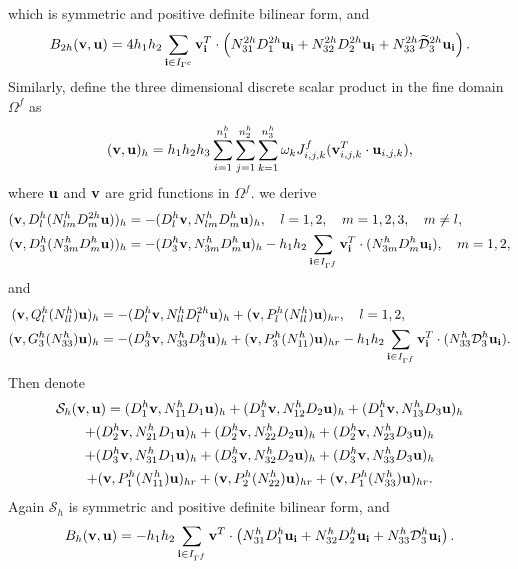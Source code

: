which is symmetric and positive definite bilinear form, and
\begin{equation}\label{bounary_c1}
B_{2h} ({\bf v},{\bf u}) = 4h_1h_2\sum_{{\bf i}\in I_{\Gamma^c}}{\bf v}_{\bf i}^T\cdot\left({N}_{31}^{2h}{D}_1^{2h}{\bf u}_{\bf i}+{N}_{32}^{2h}{D}_2^{2h}{\bf u}_{\bf i}+{N}_{33}^{2h}\wt{\mathcal{D}}_3^{2h}{\bf u}_{\bf i}\right).
\end{equation}
Similarly, define the three dimensional discrete scalar product in the fine domain $\Omega^f$ as
\begin{equation}\label{scalar_product_inner_f}
({\bf v}, {\bf u})_{h} = h_1h_2h_3\sum_{i=1}^{n_1^{h}}\sum_{j=1}^{n_2^{h}}\sum_{k=1}^{n_3^{h}}\omega_k{J}_{i,j,k}^{f}({\bf v}_{i,j,k}^T\cdot {\bf u}_{i,j,k}),
\end{equation}
where $\bf u$ and $\bf v$ are grid functions in $\Omega^f$. we derive
\begin{align}
({\bf v}, D_l^{h}(N_{lm}^{h}D_m^{2h}{\bf u}))_{h} &= -(D_l^{h}{\bf v},N_{lm}^{h}D_m^{h}{\bf u})_{h}, \quad l = 1,2,\quad m = 1,2,3,\quad m\neq l,\label{feq1}\\
({\bf v},D_3^{h}(N_{3m}^{h}D_m^{h}{\bf u}))_{h} &= -(D_3^{h}{\bf v},N_{3m}^{h}D_m^{h}{\bf u})_{h} - h_1h_2\sum_{{\bf i}\in I_{\Gamma^f}}{\bf v}_{\bf i}^T\cdot (N_{3m}^{h}{D}_m^{h}{\bf u}_{\bf i}), \quad m = 1,2,\label{feq2}
\end{align}
and
\begin{align}
({\bf v},Q_l^{h}(N_{ll}^{h}){\bf u})_{h} &= -(D_l^{h}{\bf v},N_{ll}^{h}D_l^{2h}{\bf u})_{h} + ({\bf v},P_l^{h}(N_{ll}^{h}){\bf u})_{hr},\quad l = 1,2,\label{feq3}\\
({\bf v},{G}_3^{h}(N_{33}^{h}){\bf u})_{h} &= -(D_3^{h}{\bf v},N_{33}^{h}D_3^{h}{\bf u})_{h} + ({\bf v},P_3^{h}(N_{11}^{h}){\bf u})_{hr} - h_1h_2\sum_{{\bf i}\in I_{\Gamma^f}}{\bf v}_{\bf i}^T\cdot (N_{33}^{h}{\mathcal{D}}_3^{h}{\bf u}_{\bf i}).\label{feq4}
\end{align}
Then denote
\begin{multline}\label{sh}
\mathcal{S}_{h}({\bf v},{\bf u}) = ({D}_1^{h}{\bf v},{N}_{11}^{h}{D}_1{\bf u})_{h} +  ({D}_1^{h}{\bf v},{N}_{12}^{h}{D}_2{\bf u})_{h} +  ({D}_1^{h}{\bf v},{N}_{13}^{h}{D}_3{\bf u})_{h}\\
+  ({D}_2^{h}{\bf v},{N}_{21}^{h}{D}_1{\bf u})_{h} 
+  ({D}_2^{h}{\bf v},{N}_{22}^{h}{D}_2{\bf u})_{h} +  ({D}_2^{h}{\bf v},{N}_{23}^{h}{D}_3{\bf u})_{h} \\
+  ({D}_3^{h}{\bf v},{N}_{31}^{h}{D}_1{\bf u})_{h} 
+  ({D}_3^{h}{\bf v},{N}_{32}^{h}{D}_2{\bf u})_{h} +  ({D}_3^{h}{\bf v},{N}_{33}^{h}{D}_3{\bf u})_{h}\\
+ ({\bf v}, P^{h}_1(N_{11}^h){\bf u})_{hr} + ({\bf v}, P^{h}_2(N_{22}^h){\bf u})_{hr} + ({\bf v}, P^{h}_1(N_{33}^h){\bf u})_{hr}.
\end{multline}
Again $\mathcal{S}_h$ is symmetric and positive definite bilinear form, and
\begin{equation}\label{boundary_f1}
B_h ({\bf v},{\bf u}) = -h_1h_2\sum_{{\bf i}\in I_{\Gamma^f}}{\bf v}^T\cdot\left({N}_{31}^h{D}_1^h {\bf u}_{\bf i}+ {N}_{32}^h{D}_2^h{\bf u}_{\bf i}+{N}_{33}^h\mathcal{D}_3^h{\bf u}_{\bf i}\right).
\end{equation}

